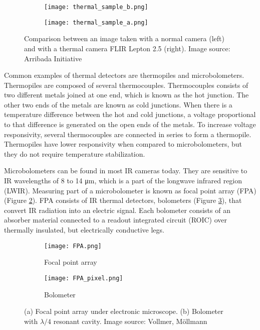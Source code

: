 \begin{figure}[ht]
    \begin{subfigure}{0.5\textwidth}
        \centering
        \texttt{[image: thermal\_sample\_b.png]} 
    \end{subfigure}
    \begin{subfigure}{0.5\textwidth}
        \centering
        \texttt{[image: thermal\_sample\_a.png]}
    \end{subfigure}
    \caption{Comparison between an image taken with a normal camera (left) and with a thermal camera FLIR Lepton 2.5 (right). Image source: Arribada Initiative\cite{thermal_comparison}}
    \label{thermal_comparison}
\end{figure}

Common examples of thermal detectors are thermopiles and microbolometers. 
Thermopiles are composed of several thermocouples.
Thermocouples consists of two different metals joined at one end, which is known as the hot junction.
The other two ends of the metals are known as cold junctions.
When there is a temperature difference between the hot and cold junctions, a voltage proportional to that difference is generated on the open ends of the metals.
To increase voltage responsivity, several thermocouples are connected in series to form a thermopile\cite{thermal_book}.
Thermopiles have lower responsivity when compared to microbolometers, but they do not require temperature stabilization\cite{thermal_book}.

Microbolometers can be found in most IR cameras today\cite{thermal_book}. 
They are sensitive to IR wavelengths of 8 to 14 \si{\micro\meter}, which is a part of the longwave infrared region (LWIR)\cite{thermal_book}.
Measuring part of a microbolometer is known as focal point array (FPA) (Figure \ref{FPA}).
FPA consists of IR thermal detectors, bolometers (Figure \ref{FPA_pixel}), that convert IR radiation into an electric signal.
Each bolometer consists of an absorber material connected to a readout integrated circuit (ROIC) over thermally insulated, but electrically conductive legs\cite{thermal_article}.
\newline

\begin{figure}[h]
    \begin{subfigure}{0.5\textwidth}
        \centering
        \texttt{[image: FPA.png]} 
        \caption{Focal point array}
        \label{FPA}
    \end{subfigure}
    \begin{subfigure}{0.5\textwidth}
        \centering
        \texttt{[image: FPA\_pixel.png]}
        \caption{Bolometer}
        \label{FPA_pixel}
    \end{subfigure}

    \caption{(a) Focal point array under electronic microscope. (b) Bolometer with $\lambda /4$ resonant cavity. Image source: Vollmer, Möllmann\cite{thermal_book}}
    \label{FPA_microbolo}
\end{figure}

